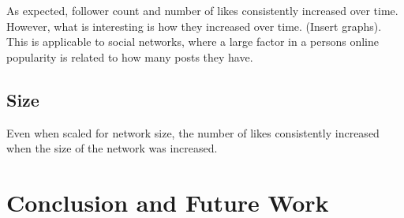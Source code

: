 \documentclass{article}
\begin{document}
As expected, follower count and number of likes consistently increased over time.
However, what is interesting is how they increased over time. (Insert graphs).
This is applicable to social networks, where a large factor in a persons online popularity
is related to how many posts they have.

\subsection{Size}
Even when scaled for network size, the number of likes consistently increased
when the size of the network was increased.

\section{Conclusion and Future Work}
\end{document}
